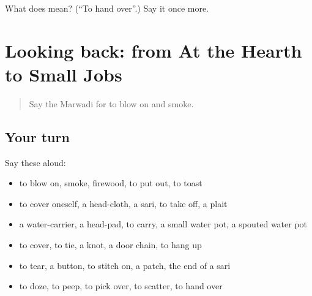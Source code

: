 \begin{tcolorbox}[breakable,colback=teal!4,colframe=teal!35!black,title={Before you move on}]
What does  mean? (\textquotedblleft{}To hand over\textquotedblright{}.) Say it once more.
\end{tcolorbox}
\section[(dialogue)]{Looking back: from At the Hearth to Small Jobs}

\label{lesson:MW-R178-review-173-178}



\begin{quote}
Say the Marwadi for to blow on and smoke.
\end{quote}

\subsection*{Your turn}
Say these aloud:

\begin{itemize}
\raggedright
  \item to blow on, smoke, firewood, to put out, to toast
  \item to cover oneself, a head-cloth, a sari, to take off, a plait
  \item a water-carrier, a head-pad, to carry, a small water pot, a spouted water pot
  \item to cover, to tie, a knot, a door chain, to hang up
  \item to tear, a button, to stitch on, a patch, the end of a sari
  \item to doze, to peep, to pick over, to scatter, to hand over
\end{itemize}

